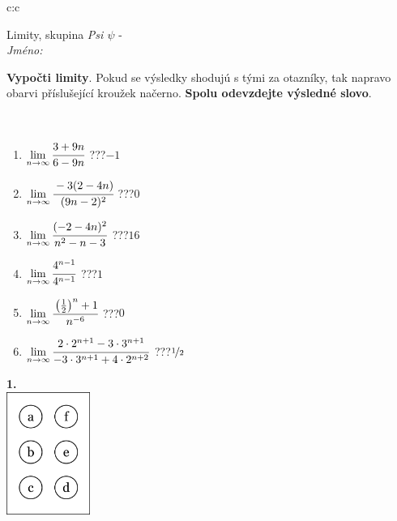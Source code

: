 \documentclass[10pt]{report}
\begin{document}
\begin{tabular}{c:c}
\begin{minipage}[c][104.5mm][t]{0.5\linewidth}
\begin{center}
\vspace{7mm}
{\huge Limity, skupina \textit{Psi $\psi$} -}\\[5mm]
\textit{Jméno:}\phantom{xxxxxxxxxxxxxxxxxxxxxxxxxxxxxxxxxxxxxxxxxxxxxxxxxxxxxxxxxxxxxxxxx}\\[5mm]
\begin{minipage}{0.95\linewidth}
\begin{center}
\textbf{Vypočti limity}. Pokud se výsledky shodujú s tými za otazníky, tak napravo\\obarvi příslušející kroužek načerno. \textbf{Spolu odevzdejte výsledné slovo}.
\end{center}
\end{minipage}
\\[1mm]
\begin{minipage}{0.79\linewidth}
\begin{center}
\begin{varwidth}{\linewidth}
\begin{enumerate}
\normalsize
\item $\lim\limits_{n\to\infty}\cfrac{3+9n}{6-9n}$\quad \dotfill\; ???\;\dotfill \quad $-1$
\item $\lim\limits_{n\to\infty}\cfrac{-3(2-4n)}{(9n-2)^2}$\quad \dotfill\; ???\;\dotfill \quad $0$
\item $\lim\limits_{n\to\infty}\cfrac{(-2-4n)^2}{n^2-n-3}$\quad \dotfill\; ???\;\dotfill \quad $16$
\item $\lim\limits_{n\to\infty}\cfrac{4^{n-1}}{4^{n-1}}$\quad \dotfill\; ???\;\dotfill \quad $1$
\item $\lim\limits_{n\to\infty}\cfrac{\left(\frac{1}{2}\right)^n +1}{n^{-6}}$\quad \dotfill\; ???\;\dotfill \quad $0$
\item $\lim\limits_{n\to\infty}\cfrac{2\cdot 2^{n+1}-3\cdot 3^{n+1}}{-3\cdot 3^{n+1}+4\cdot 2^{n+2}}$\quad \dotfill\; ???\;\dotfill \quad $\nicefrac{1}{2}$
\end{enumerate}
\end{varwidth}
\end{center}
\end{minipage}
\begin{minipage}{0.20\linewidth}
\begin{center}
{\Huge\bfseries 1.} \\[2mm]
\includegraphics[height=40mm]{../images/braille.png}

\end{center}
\end{minipage}
\end{center}
\end{minipage}
\end{tabular}
\end{document}
